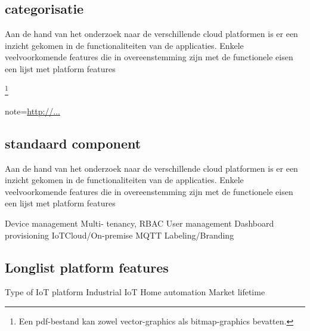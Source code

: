 \subsection{categorisatie}
Aan de hand van het onderzoek naar de verschillende cloud platformen is er een inzicht gekomen in de functionaliteiten van de applicaties. Enkele veelvoorkomende features die in overeenstemming zijn met de functionele eisen een lijst met platform features

\footnote{Een pdf-bestand kan zowel vector-graphics als
	bitmap-graphics bevatten.}



note={\url{http://...}}


\subsection{standaard component}


Aan de hand van het onderzoek naar de verschillende cloud platformen is er een inzicht gekomen in de functionaliteiten van de applicaties. Enkele veelvoorkomende features die in overeenstemming zijn met de functionele eisen een lijst met platform features

Device management
Multi- tenancy, RBAC User management  	
Dashboard provisioning
IoTCloud/On-premise 	
MQTT 	
Labeling/Branding 

\subsection{Longlist platform features}

Type of IoT platform
Industrial IoT
Home automation
Market lifetime


